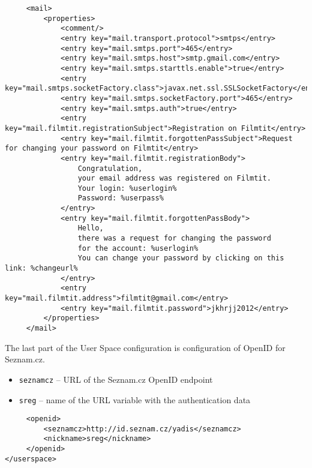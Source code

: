 \begin{lstlisting}
     <mail>
         <properties>
             <comment/>
             <entry key="mail.transport.protocol">smtps</entry>
             <entry key="mail.smtps.port">465</entry>
             <entry key="mail.smtps.host">smtp.gmail.com</entry>
             <entry key="mail.smtps.starttls.enable">true</entry>
             <entry key="mail.smtps.socketFactory.class">javax.net.ssl.SSLSocketFactory</entry>
             <entry key="mail.smtps.socketFactory.port">465</entry>
             <entry key="mail.smtps.auth">true</entry>
             <entry key="mail.filmtit.registrationSubject">Registration on Filmtit</entry>
             <entry key="mail.filmtit.forgottenPassSubject">Request for changing your password on Filmtit</entry>
             <entry key="mail.filmtit.registrationBody">
                 Congratulation,
                 your email address was registered on Filmtit.
                 Your login: %userlogin%
                 Password: %userpass%
             </entry>
             <entry key="mail.filmtit.forgottenPassBody">
                 Hello,
                 there was a request for changing the password
                 for the account: %userlogin%
                 You can change your password by clicking on this link: %changeurl%
             </entry>
             <entry key="mail.filmtit.address">filmtit@gmail.com</entry>
             <entry key="mail.filmtit.password">jkhrjj2012</entry>
         </properties>
     </mail>
\end{lstlisting}

The last part of the User Space configuration is configuration of
OpenID for Seznam.cz.

\begin{itemize}
\item \verb#seznamcz# -- URL of the Seznam.cz OpenID endpoint
\item \verb#sreg# -- name of the URL variable with the authentication data
\end{itemize}

\begin{lstlisting}
     <openid>
         <seznamcz>http://id.seznam.cz/yadis</seznamcz>
         <nickname>sreg</nickname>
     </openid>
</userspace>
\end{lstlisting}


